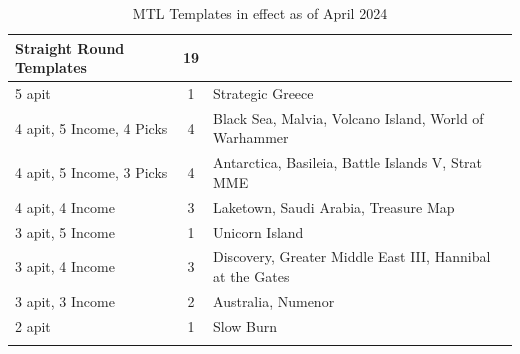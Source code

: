 \begin{longtable}{|l|c|l|c|}
\rowcolor{Light_Blue}
Straight Round Templates & 19 & & \\ \hline
5 apit & 1 & Strategic Greece & \\ \hline
4 apit, 5 Income, 4 Picks & 4 & Black Sea, Malvia, Volcano Island, World of Warhammer & \\ \hline
4 apit, 5 Income, 3 Picks & 4 & Antarctica, Basileia, Battle Islands V, Strat MME &  \\ \hline
4 apit, 4 Income & 3 & Laketown, Saudi Arabia, Treasure Map &  \\ \hline
3 apit, 5 Income & 1 & Unicorn Island & \\ \hline
3 apit, 4 Income & 3 & Discovery, Greater Middle East III, Hannibal at the Gates & \\ \hline
3 apit, 3 Income & 2 & Australia, Numenor & \\ \hline
2 apit & 1 & Slow Burn & \\ \hline
\hline
\caption{MTL Templates in effect as of April 2024}
\label{templates}
\end{longtable}
\normalsize